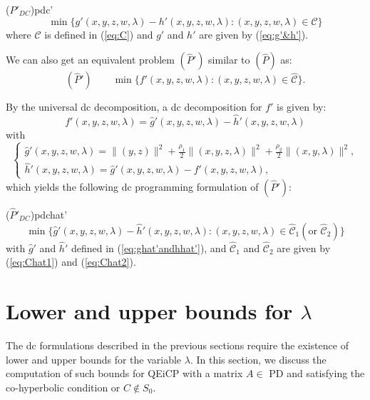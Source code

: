 \documentclass[3p]{elsarticle}
\begin{document}
\begin{Dcp}{($P'_{DC}$)}{pdc'}
	\begin{equation}\label{prob:pdc'}
	 \min \{g'(x,y,z,w,\lambda)-h'(x,y,z,w,\lambda): (x,y,z,w,\lambda)\in \mathcal{C}\}
	\end{equation} 
	where $\mathcal{C}$ is defined in (\ref{eq:C}) and $g'$ and $h'$ are given by (\ref{eq:g'&h'}).
\end{Dcp}

We can also get an equivalent problem $(\hat{P}')$ similar to $(\hat{P})$ as:
\begin{equation}\label{prob:nlphat'}
(\hat{P}') \qquad 
\min \{ f'(x,y,z,w,\lambda) : (x,y,z,w,\lambda) \in \mathcal{\hat{C}}\}.\nonumber
\end{equation}

By the universal dc decomposition, a dc decomposition for $f'$ is given by:
\[f'(x,y,z,w,\lambda) = \hat{g}'(x,y,z,w,\lambda)-\hat{h}'(x,y,z,w,\lambda)\]
with
\begin{equation}\label{eq:ghat'andhhat'}
\left\lbrace \begin{array}{l}
\hat{g}'(x,y,z,w,\lambda) = \|(y,z)\|^2+ \frac{\rho_1}{2} \|(x,y,z,\lambda)\|^2  + \frac{\rho_2}{2} \|(x,y,\lambda)\|^2, \\
\hat{h}'(x,y,z,w,\lambda) = \hat{g}'(x,y,z,w,\lambda)-f'(x,y,z,w,\lambda),
\end{array}\right. 
\end{equation}
which yields the following dc programming formulation of $(\hat{P}')$:

\begin{Dcp}{($\hat{P}'_{DC}$)}{pdchat'}
	\begin{equation}\label{prob:pdchat'}
	 \min \{\hat{g}'(x,y,z,w,\lambda)-\hat{h}'(x,y,z,w,\lambda): (x,y,z,w,\lambda)\in \mathcal{\hat{C}}_1 (\text{or } \mathcal{\hat{C}}_2)\}
	\end{equation} 
	with $\hat{g}'$ and $\hat{h}'$ defined in (\ref{eq:ghat'andhhat'}), and $\mathcal{\hat{C}}_1$ and $\mathcal{\hat{C}}_2$ are given by (\ref{eq:Chat1}) and (\ref{eq:Chat2}).
\end{Dcp}

\section{Lower and upper bounds for $\lambda$}\label{sec:boundoflambda}
The dc formulations described in the previous sections require the existence of lower and upper bounds for the variable $\lambda$. In this section, we discuss the computation of such bounds for QEiCP with a matrix $A\in$ PD and satisfying the co-hyperbolic condition or $C\notin S_0$. 
\end{document}
